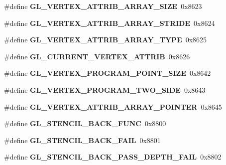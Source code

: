 \begin{DoxyCompactItemize}
\item 
\#define {\bfseries G\+L\+\_\+\+V\+E\+R\+T\+E\+X\+\_\+\+A\+T\+T\+R\+I\+B\+\_\+\+A\+R\+R\+A\+Y\+\_\+\+S\+I\+Z\+E}~0x8623\label{_s_d_l__opengl_8h_a23a9e9e68af6b13075642a1353fd115f}

\item 
\#define {\bfseries G\+L\+\_\+\+V\+E\+R\+T\+E\+X\+\_\+\+A\+T\+T\+R\+I\+B\+\_\+\+A\+R\+R\+A\+Y\+\_\+\+S\+T\+R\+I\+D\+E}~0x8624\label{_s_d_l__opengl_8h_ad708be36b5d59b68ab7c9f19f9733881}

\item 
\#define {\bfseries G\+L\+\_\+\+V\+E\+R\+T\+E\+X\+\_\+\+A\+T\+T\+R\+I\+B\+\_\+\+A\+R\+R\+A\+Y\+\_\+\+T\+Y\+P\+E}~0x8625\label{_s_d_l__opengl_8h_a719a3174d4b848cbf2883d45803fbe30}

\item 
\#define {\bfseries G\+L\+\_\+\+C\+U\+R\+R\+E\+N\+T\+\_\+\+V\+E\+R\+T\+E\+X\+\_\+\+A\+T\+T\+R\+I\+B}~0x8626\label{_s_d_l__opengl_8h_a5bb317422e4b2f35eb0f54f625dfc49e}

\item 
\#define {\bfseries G\+L\+\_\+\+V\+E\+R\+T\+E\+X\+\_\+\+P\+R\+O\+G\+R\+A\+M\+\_\+\+P\+O\+I\+N\+T\+\_\+\+S\+I\+Z\+E}~0x8642\label{_s_d_l__opengl_8h_a7bfa8245cd2258d1b2ab510d2885d40a}

\item 
\#define {\bfseries G\+L\+\_\+\+V\+E\+R\+T\+E\+X\+\_\+\+P\+R\+O\+G\+R\+A\+M\+\_\+\+T\+W\+O\+\_\+\+S\+I\+D\+E}~0x8643\label{_s_d_l__opengl_8h_a849c1bb5fc1b42785834dd174a95b68d}

\item 
\#define {\bfseries G\+L\+\_\+\+V\+E\+R\+T\+E\+X\+\_\+\+A\+T\+T\+R\+I\+B\+\_\+\+A\+R\+R\+A\+Y\+\_\+\+P\+O\+I\+N\+T\+E\+R}~0x8645\label{_s_d_l__opengl_8h_a2d788006ebbb2cf18f4427626b9969f7}

\item 
\#define {\bfseries G\+L\+\_\+\+S\+T\+E\+N\+C\+I\+L\+\_\+\+B\+A\+C\+K\+\_\+\+F\+U\+N\+C}~0x8800\label{_s_d_l__opengl_8h_ab35a8ddee6d334f74fe61c43c4009740}

\item 
\#define {\bfseries G\+L\+\_\+\+S\+T\+E\+N\+C\+I\+L\+\_\+\+B\+A\+C\+K\+\_\+\+F\+A\+I\+L}~0x8801\label{_s_d_l__opengl_8h_a1ffa1e7b112d976c2487858b0d612e5e}

\item 
\#define {\bfseries G\+L\+\_\+\+S\+T\+E\+N\+C\+I\+L\+\_\+\+B\+A\+C\+K\+\_\+\+P\+A\+S\+S\+\_\+\+D\+E\+P\+T\+H\+\_\+\+F\+A\+I\+L}~0x8802\label{_s_d_l__opengl_8h_a3b8bdd9068dbed55386fcf4742149ca3}


\end{DoxyCompactItemize}
